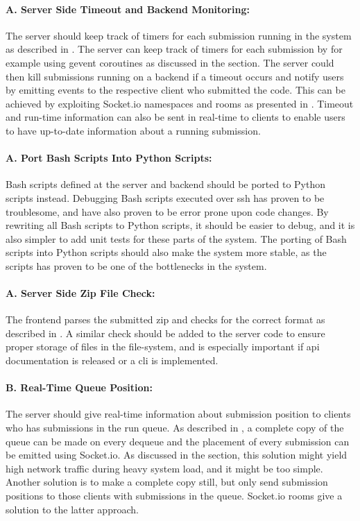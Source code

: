 \paragraph*{A. Server Side Timeout and Backend Monitoring:} The server should keep track of timers for each submission running in the system as described in . The server can keep track of timers for each submission by for example using gevent coroutines \cite{GEVENT} as discussed in the section. The server could then kill submissions running on a backend if a timeout occurs and notify users by emitting events to the respective client who submitted the code. This can be achieved by exploiting Socket.io namespaces and rooms as presented in . Timeout and run-time information can also be sent in real-time to clients to enable users to have up-to-date information about a running submission.

\paragraph*{A. Port Bash Scripts Into Python Scripts:} Bash scripts defined at the server and backend should be ported to Python scripts instead. Debugging Bash scripts executed over \gls{ssh} has proven to be troublesome, and have also proven to be error prone upon code changes. By rewriting all Bash scripts to Python scripts, it should be easier to debug, and it is also simpler to add unit tests for these parts of the system. The porting of Bash scripts into Python scripts should also make the system more stable, as the scripts has proven to be one of the bottlenecks in the system.

\paragraph*{A. Server Side Zip File Check:} The frontend parses the submitted zip and checks for the correct format as described in . A similar check should be added to the server code to ensure proper storage of files in the file-system, and is especially important if \gls{api} documentation is released or a \gls{cli} is implemented.

\paragraph*{B. Real-Time Queue Position:} The server should give real-time information about submission position to clients who has submissions in the run queue. As described in , a complete copy of the queue can be made on every dequeue and the placement of every submission can be emitted using Socket.io. As discussed in the section, this solution might yield high network traffic during heavy system load, and it might be too simple. Another solution is to make a complete copy still, but only send submission positions to those clients with submissions in the queue. Socket.io rooms give a solution to the latter approach.

